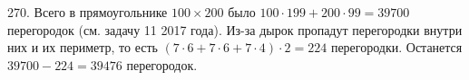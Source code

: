 270. Всего в прямоугольнике $100\times200$ было $100\cdot199+200\cdot99=39700$ перегородок (см. задачу 11 2017 года). Из-за дырок пропадут перегородки внутри них и их периметр, то есть $(7\cdot6+7\cdot6+7\cdot4)\cdot2=224$ перегородки. Останется $39700-224=39476$ перегородок.\\
